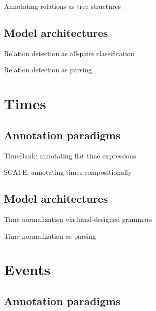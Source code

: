 \documentclass[12pt,compress]{beamer}
\begin{document}
\begin{frame}{Annotating relations as tree structures}
\end{frame}


\subsection{Model architectures}


\begin{frame}{Relation detection as all-pairs classification}
\end{frame}


\begin{frame}{Relation detection as parsing}
\end{frame}


\section{Times}


\subsection{Annotation paradigms}


\begin{frame}{TimeBank: annotating flat time expressions}
\end{frame}


\begin{frame}{SCATE: annotating times compositionally}
\end{frame}


\subsection{Model architectures}


\begin{frame}{Time normalization via hand-designed grammars}
\end{frame}


\begin{frame}{Time normalization as parsing}
\end{frame}


\section{Events}


\subsection{Annotation paradigms}
\end{document}
